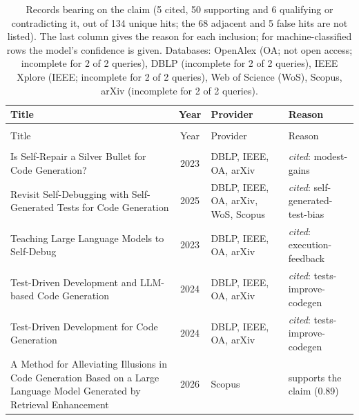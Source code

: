 
\begingroup\footnotesize
\begin{longtable}{@{}%
  >{\raggedright\arraybackslash}p{}c%
  >{\raggedright\arraybackslash}p{}%
  >{\raggedright\arraybackslash}p{}@{}}
\caption{Records bearing on the claim (5 cited, 50 supporting and 6 qualifying or contradicting it, out of 134 unique hits; the 68 adjacent and 5 false hits are not listed). The last column gives the reason for each inclusion; for machine-classified rows the model's confidence is given. Databases: OpenAlex (OA; not open access; incomplete for 2 of 2 queries), DBLP (incomplete for 2 of 2 queries), IEEE Xplore (IEEE; incomplete for 2 of 2 queries), Web of Science (WoS), Scopus, arXiv (incomplete for 2 of 2 queries).}\label{tab:t-llm-exec-feedback}\\
\toprule
Title & Year & Provider & Reason \\
\midrule
\endfirsthead
\multicolumn{4}{@{}l}{\emph{\tablename~\thetable{} (cont.)}}\\
\toprule
Title & Year & Provider & Reason \\
\midrule
\endhead
\midrule \multicolumn{4}{r@{}}{\emph{continued on next page}}\\
\endfoot
\bottomrule
\endlastfoot
Is Self-Repair a Silver Bullet for Code Generation? & 2023 & DBLP, IEEE, OA, arXiv & \emph{cited}: modest-gains \\
Revisit Self-Debugging with Self-Generated Tests for Code Generation & 2025 & DBLP, IEEE, OA, arXiv, WoS, Scopus & \emph{cited}: self-generated-test-bias \\
Teaching Large Language Models to Self-Debug & 2023 & DBLP, IEEE, OA, arXiv & \emph{cited}: execution-feedback \\
Test-Driven Development and LLM-based Code Generation & 2024 & DBLP, IEEE, OA, arXiv & \emph{cited}: tests-improve-codegen \\
Test-Driven Development for Code Generation & 2024 & DBLP, IEEE, OA, arXiv & \emph{cited}: tests-improve-codegen \\
A Method for Alleviating Illusions in Code Generation Based on a Large Language Model Generated by Retrieval Enhancement & 2026 & Scopus & supports the claim (0.89) \\

\end{longtable}
